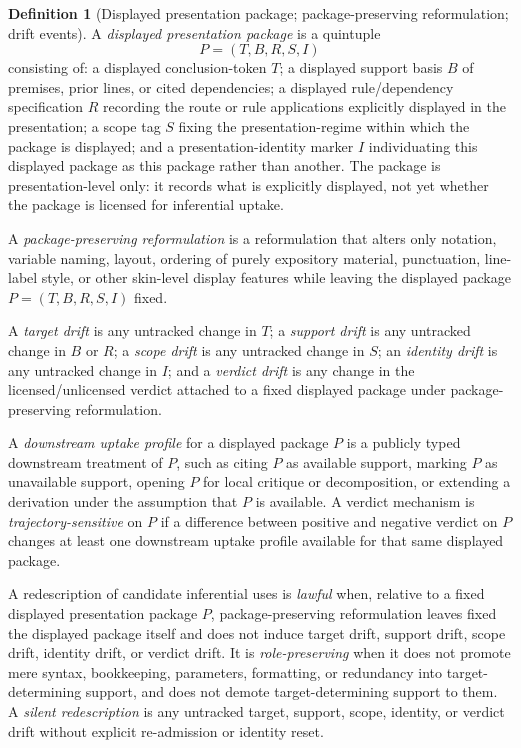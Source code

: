 \documentclass[11pt]{article}
\theoremstyle{plain}
\theoremstyle{definition}
\newtheorem{definition}[theorem]{Definition}
\begin{document}
\begin{definition}[Displayed presentation package; package-preserving reformulation; drift events]
\label{def:A-redescription}
A \emph{displayed presentation package} is a quintuple
\[
P=(T,B,R,S,I)
\]
consisting of: a displayed conclusion-token $T$; a displayed support basis $B$ of premises, prior lines, or cited dependencies; a displayed rule/dependency specification $R$ recording the route or rule applications explicitly displayed in the presentation; a scope tag $S$ fixing the presentation-regime within which the package is displayed; and a presentation-identity marker $I$ individuating this displayed package as this package rather than another. The package is presentation-level only: it records what is explicitly displayed, not yet whether the package is licensed for inferential uptake.

A \emph{package-preserving reformulation} is a reformulation that alters only notation, variable naming, layout, ordering of purely expository material, punctuation, line-label style, or other skin-level display features while leaving the displayed package $P=(T,B,R,S,I)$ fixed.

A \emph{target drift} is any untracked change in $T$; a \emph{support drift} is any untracked change in $B$ or $R$; a \emph{scope drift} is any untracked change in $S$; an \emph{identity drift} is any untracked change in $I$; and a \emph{verdict drift} is any change in the licensed/unlicensed verdict attached to a fixed displayed package under package-preserving reformulation.

A \emph{downstream uptake profile} for a displayed package $P$ is a publicly typed downstream treatment of $P$, such as citing $P$ as available support, marking $P$ as unavailable support, opening $P$ for local critique or decomposition, or extending a derivation under the assumption that $P$ is available. A verdict mechanism is \emph{trajectory-sensitive} on $P$ if a difference between positive and negative verdict on $P$ changes at least one downstream uptake profile available for that same displayed package.

A redescription of candidate inferential uses is \emph{lawful} when, relative to a fixed displayed presentation package $P$, package-preserving reformulation leaves fixed the displayed package itself and does not induce target drift, support drift, scope drift, identity drift, or verdict drift. It is \emph{role-preserving} when it does not promote mere syntax, bookkeeping, parameters, formatting, or redundancy into target-determining support, and does not demote target-determining support to them. A \emph{silent redescription} is any untracked target, support, scope, identity, or verdict drift without explicit re-admission or identity reset.
\end{definition}
\end{document}
